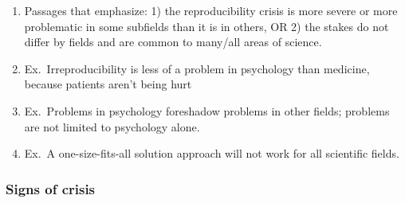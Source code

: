 \documentclass[
]{scrartcl}
\begin{document}
\begin{enumerate}
  \begin{enumerate}

  \item
    Passages that emphasize: 1) the reproducibility crisis is more
    severe or more problematic in some subfields than it is in others,
    OR 2) the stakes do not differ by fields and are common to many/all
    areas of science.
  \item
    Ex.~Irreproducibility is less of a problem in psychology than
    medicine, because patients aren't being hurt
  \item
    Ex.~Problems in psychology foreshadow problems in other fields;
    problems are not limited to psychology alone.
  \item
    Ex.~A one-size-fits-all solution approach will not work for all
    scientific fields.
  \end{enumerate}
\end{enumerate}

\hypertarget{signs-of-crisis}{%
\subsubsection{Signs of crisis}\label{signs-of-crisis}}
\end{document}
